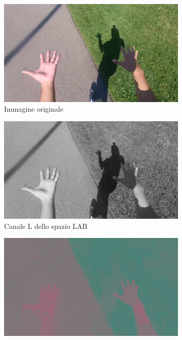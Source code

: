 \documentclass[12pt,a4paper,oneside]{article}
\begin{document}
\begin{figure}[!htb]	
	\centering
	\begin{subfigure}[t]{.495\textwidth}
		\includegraphics[width=\textwidth]{resources/images/es_LAB.png}
		\caption{Immagine originale}
	\end{subfigure}%
	\hfill
	\begin{subfigure}[t]{.495\textwidth}
		\includegraphics[width=\textwidth]{resources/images/es_LAB_L.png}
		\caption{Canale L dello spazio \mbox{LAB}}\label{es_LAB_L}
	\end{subfigure}%
	\vspace{.0033\textwidth}
	\begin{subfigure}[t]{.495\textwidth}
		\includegraphics[width=\textwidth]{resources/images/es_LAB_A.png}

\end{subfigure}
\end{figure}
\end{document}
